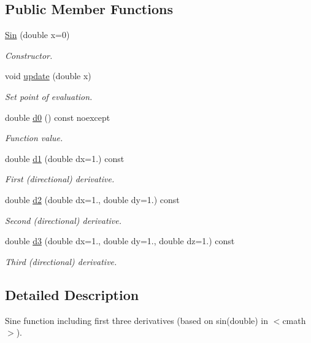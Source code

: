 \subsection*{Public Member Functions}
\begin{DoxyCompactItemize}
\item 
\hyperlink{structfuncy_1_1Sin_a158517db8475646590a6f0413075efce}{Sin} (double x=0)
\begin{DoxyCompactList}\small\item\em Constructor. \end{DoxyCompactList}\item 
void \hyperlink{structfuncy_1_1Sin_ad61c58fe64f6ae7c43ee8da18bb3105d}{update} (double x)
\begin{DoxyCompactList}\small\item\em Set point of evaluation. \end{DoxyCompactList}\item 
double \hyperlink{structfuncy_1_1Sin_a691da65591814d9d6d1696253bce453c}{d0} () const noexcept
\begin{DoxyCompactList}\small\item\em Function value. \end{DoxyCompactList}\item 
double \hyperlink{structfuncy_1_1Sin_a561a28253d315577e1823f04e47bb64a}{d1} (double dx=1.) const 
\begin{DoxyCompactList}\small\item\em First (directional) derivative. \end{DoxyCompactList}\item 
double \hyperlink{structfuncy_1_1Sin_a463e7aa393473cf7dedce6cc229bc527}{d2} (double dx=1., double dy=1.) const 
\begin{DoxyCompactList}\small\item\em Second (directional) derivative. \end{DoxyCompactList}\item 
double \hyperlink{structfuncy_1_1Sin_ab470ccf331aff2589f6f055a6fd5f043}{d3} (double dx=1., double dy=1., double dz=1.) const 
\begin{DoxyCompactList}\small\item\em Third (directional) derivative. \end{DoxyCompactList}\end{DoxyCompactItemize}


\subsection{Detailed Description}
Sine function including first three derivatives (based on sin(double) in $<$cmath$>$). 

